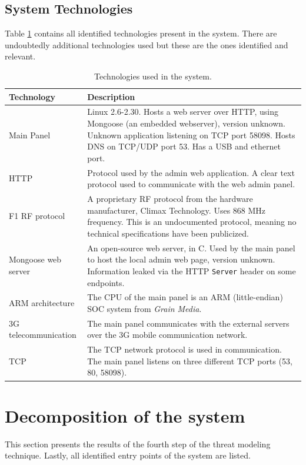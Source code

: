 \subsection{System Technologies}
Table \ref{tb:system-technologies} contains all identified technologies present in the system. There are undoubtedly additional technologies used but these are the ones identified and relevant.
\begin{table}[!p]
    \centering
    \begin{tabularx}{\textwidth}{l X}
        \hline
        \textbf{Technology}  & \textbf{Description}
        \\ \hline
        Main Panel & Linux 2.6-2.30. Hosts a web server over HTTP, using Mongoose (an embedded webserver), version unknown. Unknown application listening on TCP port 58098. Hosts DNS on TCP/UDP port 53. Has a USB and ethernet port.
        \\ \hline
        HTTP  & Protocol used by the admin web application. A clear text protocol used to communicate with the web admin panel.
        \\ \hline
        F1 RF protocol  & A proprietary \gls{RF} protocol from the hardware manufacturer, Climax Technology. Uses 868 MHz frequency. This is an undocumented protocol, meaning no technical specifications have been publicized.
        \\ \hline
        Mongoose web server  & An open-source web server, in C. Used by the main panel to host the local admin web page, version unknown. Information leaked via the HTTP \texttt{Server} header on some endpoints.
        \\ \hline
        ARM architecture  & The CPU of the main panel is an ARM (little-endian) SOC system from \textit{Grain Media}.
        \\ \hline
        3G telecommunication  & The main panel communicates with the external servers over the 3G mobile communication network.
        \\ \hline
        TCP  & The \gls{TCP} network protocol is used in communication. The main panel listens on three different TCP ports (53, 80, 58098).
        \\ \hline
    \end{tabularx}
    \caption{Technologies used in the system.}
    \label{tb:system-technologies}
\end{table}

\section{Decomposition of the system}
This section presents the results of the fourth step of the threat modeling technique. Lastly, all identified entry points of the system are listed.

